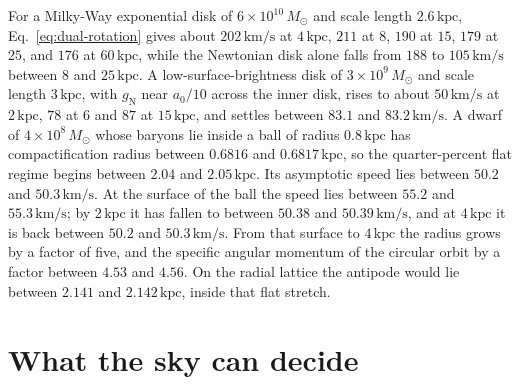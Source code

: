 \documentclass[a4paper]{article}
\begin{document}
For a Milky-Way exponential disk of $6\times10^{10}\,M_\odot$ and scale length $2.6\,\mathrm{kpc}$, Eq.~\eqref{eq:dual-rotation} gives about $202\,\mathrm{km/s}$ at $4\,\mathrm{kpc}$, $211$ at $8$, $190$ at $15$, $179$ at $25$, and $176$ at $60\,\mathrm{kpc}$, while the Newtonian disk alone falls from $188$ to $105\,\mathrm{km/s}$ between $8$ and $25\,\mathrm{kpc}$. A low-surface-brightness disk of $3\times10^{9}\,M_\odot$ and scale length $3\,\mathrm{kpc}$, with $g_{\text{N}}$ near $a_0/10$ across the inner disk, rises to about $50\,\mathrm{km/s}$ at $2\,\mathrm{kpc}$, $78$ at $6$ and $87$ at $15\,\mathrm{kpc}$, and settles between $83.1$ and $83.2\,\mathrm{km/s}$. A dwarf of $4\times10^{8}\,M_\odot$ whose baryons lie inside a ball of radius $0.8\,\mathrm{kpc}$ has compactification radius between $0.6816$ and $0.6817\,\mathrm{kpc}$, so the quarter-percent flat regime begins between $2.04$ and $2.05\,\mathrm{kpc}$. Its asymptotic speed lies between $50.2$ and $50.3\,\mathrm{km/s}$. At the surface of the ball the speed lies between $55.2$ and $55.3\,\mathrm{km/s}$; by $2\,\mathrm{kpc}$ it has fallen to between $50.38$ and $50.39\,\mathrm{km/s}$, and at $4\,\mathrm{kpc}$ it is back between $50.2$ and $50.3\,\mathrm{km/s}$. From that surface to $4\,\mathrm{kpc}$ the radius grows by a factor of five, and the specific angular momentum of the circular orbit by a factor between $4.53$ and $4.56$. On the radial lattice the antipode would lie between $2.141$ and $2.142\,\mathrm{kpc}$, inside that flat stretch.

\section{What the sky can decide}
\label{sec:sky}
\end{document}

